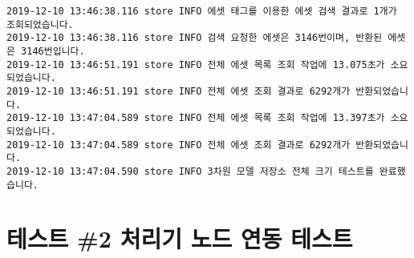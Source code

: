 \begin{Verbatim}[fontsize=\tiny, breaklines=true, breakanywhere=true]
2019-12-10 13:46:38.116 store INFO 에셋 태그를 이용한 에셋 검색 결과로 1개가 조회되었습니다.
2019-12-10 13:46:38.116 store INFO 검색 요청한 에셋은 3146번이며, 반환된 에셋은 3146번입니다.
2019-12-10 13:46:51.191 store INFO 전체 에셋 목록 조회 작업에 13.075초가 소요되었습니다.
2019-12-10 13:46:51.191 store INFO 전체 에셋 조회 결과로 6292개가 반환되었습니다.
2019-12-10 13:47:04.589 store INFO 전체 에셋 목록 조회 작업에 13.397초가 소요되었습니다.
2019-12-10 13:47:04.589 store INFO 전체 에셋 조회 결과로 6292개가 반환되었습니다.
2019-12-10 13:47:04.590 store INFO 3차원 모델 저장소 전체 크기 테스트를 완료했습니다.
\end{Verbatim}

\section{테스트 \#2 처리기 노드 연동 테스트}
